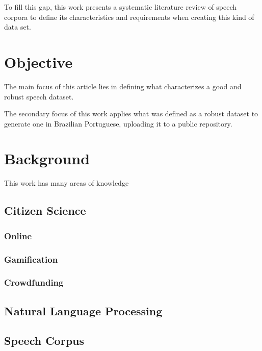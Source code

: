To fill this gap, this work presents a systematic literature review of speech corpora to define its characteristics and requirements when creating this kind of data set.

\chapter{Objective}

The main focus of this article lies in defining what characterizes a good and robust speech dataset.

The secondary focus of this work applies what was defined as a robust dataset to generate one in Brazilian Portuguese, uploading it to a public repository. 

\chapter{Background}

This work has many areas of knowledge

\section{Citizen Science}

\subsection{Online}
\subsection{Gamification}
\subsection{Crowdfunding}

\section{Natural Language Processing}

\subsection{}

\section{Speech Corpus}
